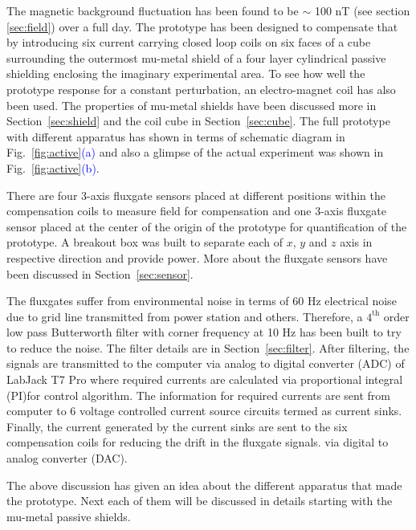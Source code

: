 The magnetic background fluctuation has been found to be $\sim$ 100 nT (see section \ref{sec:field}) over a full day. The prototype has been designed to compensate that by introducing six current carrying closed loop coils on six faces of a cube surrounding the outermost mu-metal shield of a four layer cylindrical passive shielding enclosing the imaginary experimental area. To see how well the prototype response for a constant perturbation, an electro-magnet coil has also been used. The properties of mu-metal shields have been discussed more in Section~\ref{sec:shield} and the coil cube in Section~\ref{sec:cube}. The full prototype with different apparatus has shown in terms of schematic diagram in Fig.~\ref{fig:active}\textcolor{blue}{(a)} and also a glimpse of the actual experiment was shown in Fig.~\ref{fig:active}\textcolor{blue}{(b)}.

There are four 3-axis fluxgate sensors placed at different positions within the compensation coils to measure field for compensation and one 3-axis fluxgate sensor placed at the center of the origin of the prototype for quantification of the prototype. A breakout box was built to separate each of $x$, $y$ and $z$ axis in respective direction and provide power. More about the fluxgate sensors have been discussed in Section~\ref{sec:sensor}.


The fluxgates suffer from environmental noise in terms of 60 Hz electrical noise due to grid line transmitted from power station and others. Therefore, a $\mathrm{4^{th}}$ order low pass Butterworth filter with corner frequency at 10 Hz has been built to try to reduce the noise. The filter details are in Section~\ref{sec:filter}. After filtering, the signals are transmitted to the computer via analog to digital converter (ADC) of LabJack T7 Pro where required currents are calculated via proportional integral (PI)for control algorithm. The information for required currents are sent from computer to 6 voltage controlled current source circuits termed as current sinks. Finally, the current generated by the current sinks are sent to the six compensation coils for reducing the drift in the fluxgate signals.  via digital to analog converter (DAC).

The above discussion  has given an idea about the different apparatus that made the prototype. Next each of them will be discussed in details starting with  the mu-metal passive shields.

